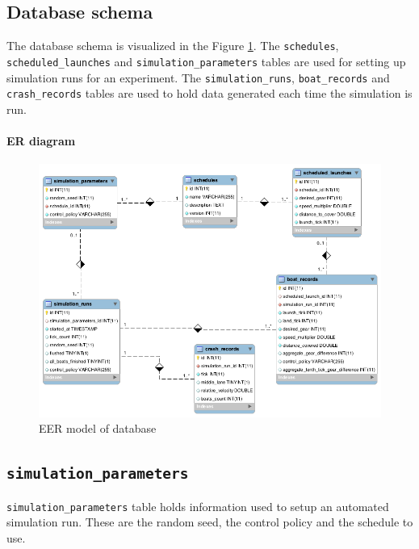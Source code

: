\subsection{Database schema}\label{software:experiment:db}

The database schema is visualized in the Figure
\ref{software:fig:eer}. The \texttt{schedules}, \texttt{scheduled\_launches} and
\texttt{simulation\_parameters} tables are used for setting up simulation runs for an
experiment. The \texttt{simulation\_runs}, \texttt{boat\_records} and
\texttt{crash\_records} tables are used to hold data generated each
time the simulation is run.

\paragraph{ER diagram}

\begin{figure}
\begin{center}
  \includegraphics[scale=0.3]{images/eer.png}
  \caption{EER model of database}
  \label{software:fig:eer}
\end{center}
\end{figure}

\subsection{\texttt{simulation\_parameters}}
\texttt{simulation\_parameters} table holds information used to setup
an automated simulation run. These are the random seed, the control
policy and the schedule to use.

